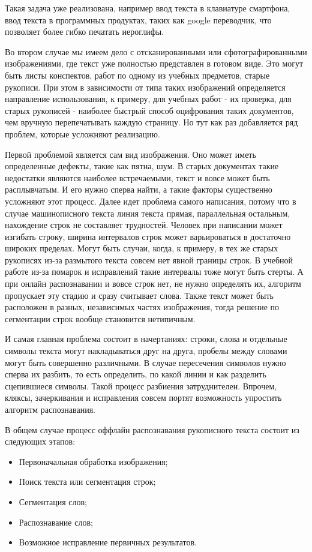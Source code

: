 Такая задача уже реализована, например ввод текста в клавиатуре смартфона, ввод текста в программных продуктах, таких как google переводчик, что позволяет более гибко печатать иероглифы.

Во втором случае мы имеем дело с отсканированными или сфотографированными изображениями, где текст уже полностью представлен в готовом виде. Это могут быть листы конспектов, работ по одному из учебных предметов, старые рукописи. При этом в зависимости от типа таких изображений определяется направление использования, к примеру, для учебных работ - их проверка, для старых рукописей - наиболее быстрый способ оцифрования таких документов, чем вручную перепечатывать каждую страницу. Но тут как раз добавляется ряд проблем, которые усложняют реализацию.

Первой проблемой является сам вид изображения. Оно может иметь определенные дефекты, такие как пятна, шум. В старых документах такие недостатки являются наиболее встречаемыми, текст и вовсе может быть расплывчатым. И его нужно сперва найти, а такие факторы существенно усложняют этот процесс. Далее идет проблема самого написания, потому что в случае машинописного текста линия текста прямая, параллельная остальным, нахождение строк не составляет трудностей. Человек при написании может изгибать строку, ширина интервалов строк может варьироваться в достаточно широких пределах. Могут быть случаи, когда, к примеру, в тех же старых рукописях из-за размытого текста совсем нет явной границы строк. В учебной работе из-за помарок и исправлений такие интервалы тоже могут быть стерты. А при онлайн распознавании и вовсе строк нет, не нужно определять их, алгоритм пропускает эту стадию и сразу считывает слова. Также текст может быть расположен в разных, независимых частях изображения, тогда решение по сегментации строк вообще становится нетипичным. 

И самая главная проблема состоит в начертаниях: строки, слова и отдельные символы текста могут накладываться друг на друга, пробелы между словами могут быть совершенно различными. В случае пересечения символов нужно сперва их разбить, то есть определить, по какой линии и как разделить сцепившиеся символы. Такой процесс разбиения затруднителен. Впрочем, кляксы, зачеркивания и исправления совсем портят возможность упростить алгоритм распознавания.\cite{li}

В общем случае процесс оффлайн распознавания рукописного текста состоит из следующих этапов:
\begin{itemize}
	\item Первоначальная обработка изображения;
	\item Поиск текста или сегментация строк;
	\item Сегментация слов;
	\item Распознавание слов;
	\item Возможное исправление первичных результатов.
\end{itemize}
	
